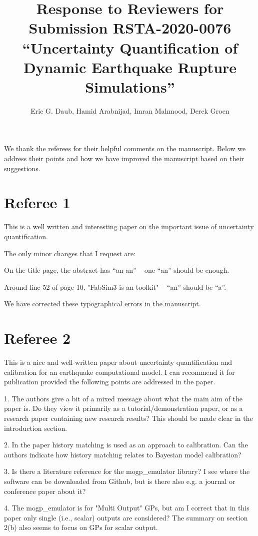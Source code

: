 \documentclass{article}
\title{Response to Reviewers for Submission RSTA-2020-0076 ``Uncertainty Quantification of Dynamic Earthquake Rupture Simulations''}
\author{Eric G. Daub, Hamid Arabnijad, Imran Mahmood, Derek Groen}
\begin{document}
\maketitle

We thank the referees for their helpful comments on the manuscript. Below
we address their points and how we have improved the manuscript based on
their suggestions.

\section{Referee 1}

This is a well written and interesting paper on the important issue of uncertainty quantification.

The only minor changes that I request are:

On the title page, the abstract has ``an an'' -- one ``an'' should be enough.

Around line 52 of page 10, "FabSim3 is an toolkit" -- ``an'' should be ``a''.

We have corrected these typographical errors in the manuscript.

\section{Referee 2}

This is a nice and well-written paper about uncertainty quantification and calibration for an earthquake computational model. I can recommend it for publication provided the following points are addressed in the paper.

1. The authors give a bit of a mixed message about what the main aim of the paper is. Do they view it primarily as a tutorial/demonstration paper, or as a research paper containing new research results? This should be made clear in the introduction section.

2. In the paper history matching is used as an approach to calibration. Can the authors indicate how history matching relates to Bayesian model calibration?

3. Is there a literature reference for the mogp\_emulator library? I see where the software can be downloaded from Github, but is there also e.g. a journal or conference paper about it?

4. The mogp\_emulator is for "Multi Output" GPs, but am I correct that in this paper only single (i.e., scalar) outputs are considered? The summary on section 2(b) also seems to focus on GPs for scalar output.
\end{document}
